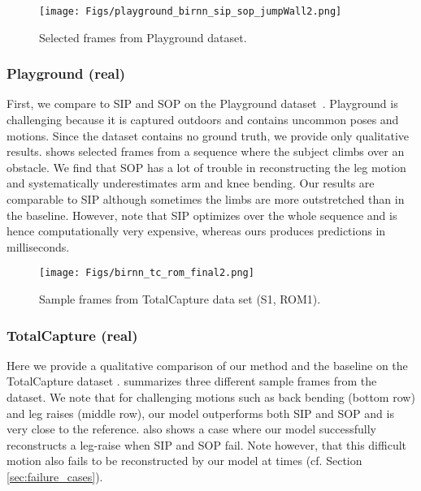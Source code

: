 \documentclass[acmtog]{acmart}
\begin{document}
\begin{figure}
\centering
\texttt{[image: Figs/playground\_birnn\_sip\_sop\_jumpWall2.png]}
\caption{Selected frames from Playground dataset.}
\label{fig:playground_birnn_sip_sop}
\end{figure}\subsubsection{Playground (real)}
First, we compare to SIP and SOP on the Playground dataset~\cite{von2017sparse}. Playground is challenging because it is captured outdoors and contains uncommon poses and motions. Since the dataset contains no ground truth,  we provide only qualitative results.  shows selected frames from a sequence where the subject climbs over an obstacle. We find that SOP has a lot of trouble in reconstructing the leg motion and systematically underestimates arm and knee bending. Our results are comparable to SIP although sometimes the limbs are more outstretched than in the baseline. However, note that SIP optimizes over the whole sequence and is hence computationally very expensive, whereas ours produces predictions in milliseconds.   
\begin{figure}
\texttt{[image: Figs/birnn\_tc\_rom\_final2.png]}
\caption{Sample frames from TotalCapture data set (S1, ROM1).}
\label{fig:tc_birnn_sip_sop}
\end{figure}\subsubsection{TotalCapture (real)}
Here we provide a qualitative comparison of our method and the baseline on the TotalCapture dataset \cite{trumble2017total}.
 summarizes three different sample frames from the dataset. We note that for challenging motions such as back bending (bottom row) and leg raises (middle row), our model outperforms both SIP and SOP and is very close to the reference.  also shows a case where our model successfully reconstructs a leg-raise when SIP and SOP fail. Note however, that this difficult motion also fails to be reconstructed by our model at times (cf. Section \ref{sec:failure_cases}).
\end{document}
